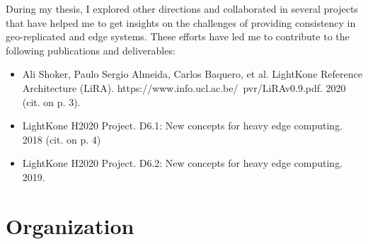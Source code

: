 During my thesis, I explored other directions and collaborated in several projects that have helped me to get insights on the challenges of providing consistency in geo-replicated and edge systems. These efforts have led me to contribute to the following publications and deliverables:

\begin{itemize}
  \item Ali Shoker, Paulo Sergio Almeida, Carlos Baquero, et al. LightKone Reference Architecture (LiRA). https://www.info.ucl.ac.be/~pvr/LiRAv0.9.pdf. 2020 (cit. on p. 3). \cite{LiRAv09p46:online}
  \item LightKone H2020 Project. D6.1: New concepts for heavy edge computing. 2018 (cit. on p. 4) \cite{D61Newco32:online}
  \item LightKone H2020 Project. D6.2: New concepts for heavy edge computing. 2019. \cite{D62Newco60:online}
\end{itemize}

\section{Organization}
\label{sec:intro:organisation}

